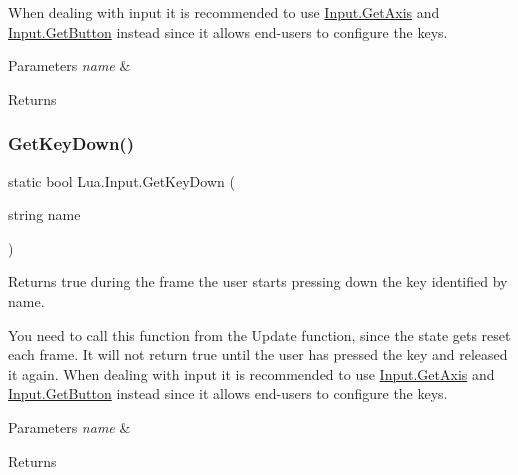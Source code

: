 When dealing with input it is recommended to use \mbox{\hyperlink{class_lua_1_1_input_a616e22e4f3b9c973c9763c10dc495395}{Input.\+Get\+Axis}} and \mbox{\hyperlink{class_lua_1_1_input_ac45bfbc1aaa71822f9dd32ee446e3e26}{Input.\+Get\+Button}} instead since it allows end-\/users to configure the keys. 
\begin{DoxyParams}{Parameters}
{\em name} & \\
\hline
\end{DoxyParams}
\begin{DoxyReturn}{Returns}

\end{DoxyReturn}
\mbox{\label{class_lua_1_1_input_a8701b16492ad5e1ec79c019d74f7b051}} 
\subsubsection{\texorpdfstring{GetKeyDown()}{GetKeyDown()}}
{\footnotesize\ttfamily static bool Lua.\+Input.\+Get\+Key\+Down (\begin{DoxyParamCaption}\item[{string}]{name }\end{DoxyParamCaption})\hspace{0.3cm}{\ttfamily [static]}}



Returns true during the frame the user starts pressing down the key identified by name. 

You need to call this function from the Update function, since the state gets reset each frame. It will not return true until the user has pressed the key and released it again. When dealing with input it is recommended to use \mbox{\hyperlink{class_lua_1_1_input_a616e22e4f3b9c973c9763c10dc495395}{Input.\+Get\+Axis}} and \mbox{\hyperlink{class_lua_1_1_input_ac45bfbc1aaa71822f9dd32ee446e3e26}{Input.\+Get\+Button}} instead since it allows end-\/users to configure the keys. 
\begin{DoxyParams}{Parameters}
{\em name} & \\
\hline
\end{DoxyParams}
\begin{DoxyReturn}{Returns}

\end{DoxyReturn}
\mbox{\label{class_lua_1_1_input_a7c9f4df5dcb4bc4d194da55be31fb0ea}} 

